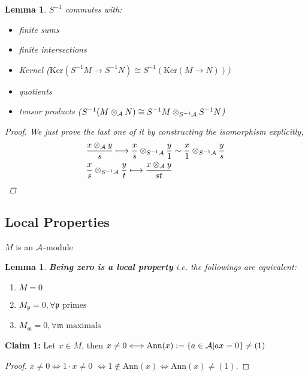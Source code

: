\documentclass[11pt]{article}
\newtheorem{lemma}[thm]{Lemma}
\newcommand{\scm}{{\mathfrak m}}
\newcommand{\scp}{{\mathfrak p}}
\newcommand{\cala}{{\cal A}}
\newcommand{\lrta}{\longrightarrow}
\newcommand{\Llrta}{\Longleftrightarrow}
\begin{document}
\begin{lemma}
$S^{-1} $ commutes with:
\begin{itemize}
\item finite sums 
\item finite intersections
\item Kernel ($\text{Ker}(S^{-1}M\lrta S^{-1}N)\cong S^{-1}(\text{Ker}(M\lrta N))$)
\item quotients 
\item tensor products ($S^{-1}(M\otimes_\cala N)\cong S^{-1} M\otimes_{S^{-1}\cala}S^{-1}N$)
\end{itemize} 
\begin{proof}
We just prove the last one of it by constructing the isomorphism explicitly,
$$
\begin{aligned}
&\frac{x\otimes_\cala y}{s}\longmapsto \frac{x}{s}\otimes_{S^{-1}\cala}\frac{y}{1}\sim \frac{x}{1}\otimes_{S^{-1}\cala}\frac{y}{s}\\
&\frac{x}{s}\otimes_{S^{-1}\cala}\frac{y}{t}\longmapsto \frac{x\otimes_\cala y}{s t} 
\end{aligned}
$$
\end{proof}
\end{lemma}

\subsection*{Local Properties}
$M$ is an $\cala$-module
\begin{lemma}\label{lem:zerpo_local}
\textbf{Being zero is a local property} i.e. the followings are equivalent:
\begin{enumerate}[label=(\alph*)]
\item $M=0$
\item $M_\scp=0,\forall \scp \text{ primes }$
\item $M_\scm=0,\forall \scm \text{ maximals}$
\end{enumerate}
\end{lemma}
\noindent\textbf{Claim 1:}
Let $x\in M$, then $x\neq 0\Longleftrightarrow \text{Ann}(x):=\{a\in\cala|ax=0\}\neq (1)$
\begin{proof}
$x\neq 0\Llrta 1\cdot x\neq 0$ $\Llrta 1\notin \text{Ann}(x)\Llrta \text{Ann}(x)\neq (1)$.
\end{proof}
\end{document}
